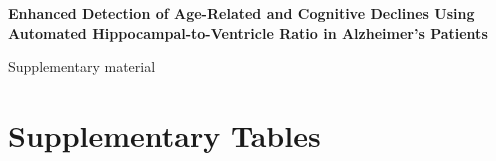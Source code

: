 \documentclass{article}
\begin{document}
\begin{titlepage}
\begin{center}
\vspace*{3cm}\par
\Large
\textbf{Enhanced Detection of Age-Related and Cognitive Declines Using Automated Hippocampal-to-Ventricle Ratio in Alzheimer's Patients}
\vspace*{2cm}\par
\Huge
Supplementary material
\end{center}
\end{titlepage}
\thispagestyle{empty}
\renewcommand{\listtablename}{List of Supplementary Tables}
\renewcommand{\listfigurename}{List of Supplementary Figures}
\listoftables
\listoffigures
\clearpage
{}
\centering
\section*{Supplementary Tables}
\vspace*{2cm}\par
\centering

\centering

\centering

\centering

\centering

\centering

\centering

\clearpage
\end{document}
